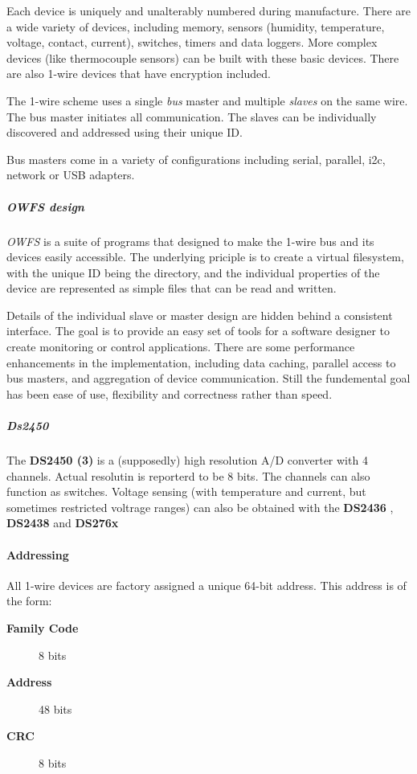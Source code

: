 Each device is uniquely and
unalterably numbered during manufacture. There are a wide variety of devices,
including memory, sensors (humidity, temperature, voltage, contact, current),
switches, timers and data loggers. More complex devices (like thermocouple
sensors) can be built with these basic devices. There are also 1-wire devices
that have encryption included. 

The 1-wire scheme uses a single  \textit{bus} master
and multiple \textit{slaves} on the same wire. The bus master initiates all communication.
The slaves can be  individually discovered and addressed using their unique
ID. 

Bus masters come in a variety of configurations including serial, parallel,
i2c, network or USB adapters. 
\subparagraph*{OWFS design}\textit{OWFS} is a suite of programs that
designed to make the 1-wire bus and its devices easily accessible. The underlying
priciple is to create a virtual filesystem, with the unique ID being the
directory, and the individual properties of the device are represented
as simple files that can be read and written. 

Details of the individual
slave or master design are hidden behind a consistent interface. The goal
is to  provide an easy set of tools for a software designer to create monitoring
or control applications. There  are some performance enhancements in the
implementation, including data caching, parallel access to bus  masters,
and aggregation of device communication. Still the fundemental goal has
been ease of use, flexibility  and correctness rather than speed.  
\subparagraph*{Ds2450}The
\textsf{\textbf{DS2450 (3)}} is a (supposedly) high resolution A/D converter with 4 channels.
Actual resolutin is reporterd to be 8 bits. The channels can also function
as switches. Voltage sensing (with temperature and current, but sometimes
restricted voltrage ranges) can also be obtained with the \textbf{DS2436} , \textbf{DS2438}
and \textbf{DS276x} 
\paragraph*{Addressing}
          All 1-wire devices are factory assigned a
unique 64-bit address. This address is of the form: \begin{description}
\item [\textbf{Family Code} ] 8 bits 
\item [\textbf{Address}
] 48 bits 
\item [\textbf{CRC} ] 8 bits 
\end{description}


